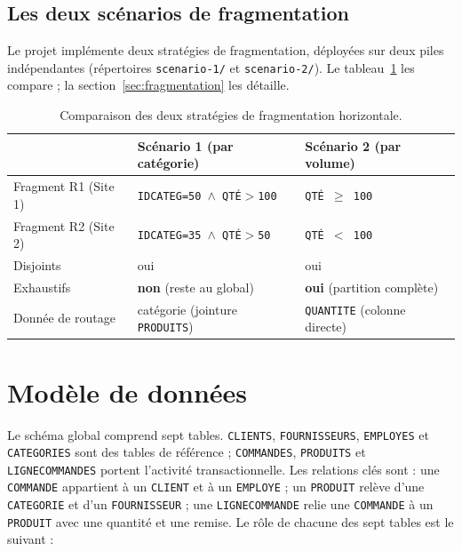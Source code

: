 \documentclass[11pt,a4paper]{article}
\begin{document}
\subsection{Les deux scénarios de fragmentation}

Le projet implémente deux stratégies de fragmentation, déployées sur deux piles
indépendantes (répertoires \texttt{scenario-1/} et \texttt{scenario-2/}). Le
tableau~\ref{tab:scenarios} les compare ; la section~\ref{sec:fragmentation}
les détaille.

\begin{table}[h]
\centering
\begin{tabular}{@{}lll@{}}
\toprule
 & \textbf{Scénario 1 (par catégorie)} & \textbf{Scénario 2 (par volume)} \\
\midrule
Fragment R1 (Site 1) & \texttt{IDCATEG=50 $\wedge$ QTÉ$>$100} & \texttt{QTÉ $\geq$ 100} \\
Fragment R2 (Site 2) & \texttt{IDCATEG=35 $\wedge$ QTÉ$>$50}  & \texttt{QTÉ $<$ 100} \\
Disjoints            & oui & oui \\
Exhaustifs           & \textbf{non} (reste au global) & \textbf{oui} (partition complète) \\
Donnée de routage    & catégorie (jointure \texttt{PRODUITS}) & \texttt{QUANTITE} (colonne directe) \\
\bottomrule
\end{tabular}
\caption{Comparaison des deux stratégies de fragmentation horizontale.}
\label{tab:scenarios}
\end{table}

\section{Modèle de données}

Le schéma global comprend sept tables. \texttt{CLIENTS}, \texttt{FOURNISSEURS},
\texttt{EMPLOYES} et \texttt{CATEGORIES} sont des tables de référence ;
\texttt{COMMANDES}, \texttt{PRODUITS} et \texttt{LIGNECOMMANDES} portent
l'activité transactionnelle. Les relations clés sont : une \texttt{COMMANDE}
appartient à un \texttt{CLIENT} et à un \texttt{EMPLOYE} ; un \texttt{PRODUIT}
relève d'une \texttt{CATEGORIE} et d'un \texttt{FOURNISSEUR} ; une
\texttt{LIGNECOMMANDE} relie une \texttt{COMMANDE} à un \texttt{PRODUIT} avec
une quantité et une remise. Le rôle de chacune des sept tables est le suivant :
\end{document}
